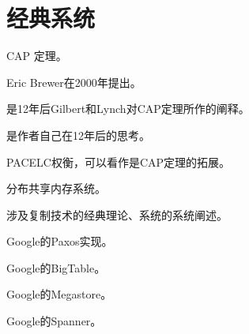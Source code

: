 \chapter{经典系统}

\begin{theorem}
    
    CAP 定理。
    
    Eric Brewer在2000年提出。
    
    \cite{Gilbert12}是12年后Gilbert和Lynch对CAP定理所作的阐释。
    
    \cite{Brewer12}是作者自己在12年后的思考。
    
\end{theorem}

\begin{theorem}
    
    PACELC权衡，可以看作是CAP定理的拓展。
    
\end{theorem}

\begin{theorem}[\cite{Li89}]
    
    分布共享内存系统。
    
\end{theorem}

\begin{theorem}
    
    涉及复制技术的经典理论、系统的系统阐述。
    
\end{theorem}

\begin{theorem}
    
    Google的Paxos实现。
    
\end{theorem}

\begin{theorem}
    
    Google的BigTable。
    
\end{theorem}

\begin{theorem}
    
    Google的Megastore。
    
\end{theorem}

\begin{theorem}
    
    Google的Spanner。
    
\end{theorem}

